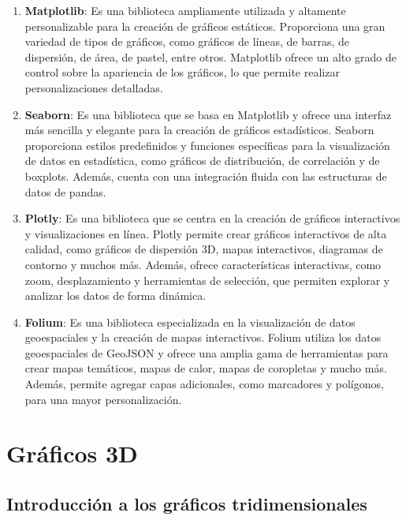 \documentclass[
  a4paper,
]{article}
\begin{document}
\begin{enumerate}
\def\labelenumi{\arabic{enumi}.}
\item
  \textbf{Matplotlib}: Es una biblioteca ampliamente utilizada y
  altamente personalizable para la creación de gráficos estáticos.
  Proporciona una gran variedad de tipos de gráficos, como gráficos de
  líneas, de barras, de dispersión, de área, de pastel, entre otros.
  Matplotlib ofrece un alto grado de control sobre la apariencia de los
  gráficos, lo que permite realizar personalizaciones detalladas.
\item
  \textbf{Seaborn}: Es una biblioteca que se basa en Matplotlib y ofrece
  una interfaz más sencilla y elegante para la creación de gráficos
  estadísticos. Seaborn proporciona estilos predefinidos y funciones
  específicas para la visualización de datos en estadística, como
  gráficos de distribución, de correlación y de boxplots. Además, cuenta
  con una integración fluida con las estructuras de datos de pandas.
\item
  \textbf{Plotly}: Es una biblioteca que se centra en la creación de
  gráficos interactivos y visualizaciones en línea. Plotly permite crear
  gráficos interactivos de alta calidad, como gráficos de dispersión 3D,
  mapas interactivos, diagramas de contorno y muchos más. Además, ofrece
  características interactivas, como zoom, desplazamiento y herramientas
  de selección, que permiten explorar y analizar los datos de forma
  dinámica.
\item
  \textbf{Folium}: Es una biblioteca especializada en la visualización
  de datos geoespaciales y la creación de mapas interactivos. Folium
  utiliza los datos geoespaciales de GeoJSON y ofrece una amplia gama de
  herramientas para crear mapas temáticos, mapas de calor, mapas de
  coropletas y mucho más. Además, permite agregar capas adicionales,
  como marcadores y polígonos, para una mayor personalización.
\end{enumerate}

\hypertarget{gruxe1ficos-3d}{%
\section{Gráficos 3D}\label{gruxe1ficos-3d}}

\hypertarget{introducciuxf3n-a-los-gruxe1ficos-tridimensionales}{%
\subsection{Introducción a los gráficos
tridimensionales}\label{introducciuxf3n-a-los-gruxe1ficos-tridimensionales}}
\end{document}
